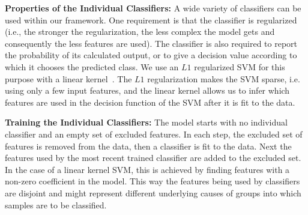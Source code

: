 \textbf{Properties of the Individual Classifiers:}
A wide variety of classifiers can be used within our framework. One requirement is that the classifier is regularized (i.e., the stronger the regularization, the less complex the model gets and consequently the less features are used). The classifier is also required to report the probability of its calculated output, or to give a decision value according to which it chooses the predicted class. We use an $L1$ regularized SVM for this purpose with a linear kernel~\cite{bradley1998feature}. The $L1$ regularization makes the SVM sparse, i.e. using only a few input features, and the linear kernel allows us to infer which features are used in the decision function of the SVM after it is fit to the data.

\textbf{Training the Individual Classifiers:}
The model starts with no individual classifier and an empty set of excluded features. In each step, the excluded set of features is removed from the data, then a classifier is fit to the data. Next the features used by the most recent trained classifier are added to the excluded set. In the case of a linear kernel SVM, this is achieved by finding features with a non-zero coefficient in the model. This way the features being used by classifiers are disjoint and might represent different underlying causes of groups into which samples are to be classified.

